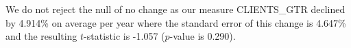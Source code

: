 We do not reject the null of no change as our measure CLIENTS\_GTR declined by 4.914\% on average per year where the standard error of this change is 4.647\% and the resulting $t$-statistic is -1.057 ($p$-value is 0.290).